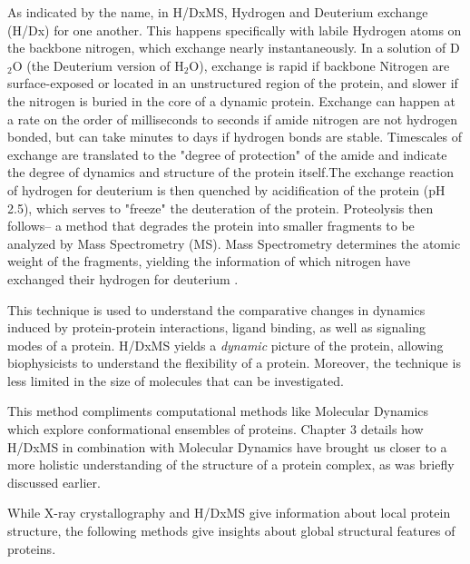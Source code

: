 \documentclass[12pt]{ucsddissertation}
\begin{document}
\begin{dissertationintroduction}
As indicated by the name, in H/DxMS, Hydrogen and Deuterium exchange (H/Dx) for one another. This happens specifically with labile Hydrogen atoms on the backbone nitrogen, which exchange nearly instantaneously.  In a solution of D$_{2}$O (the Deuterium version of H$_{2}$O), exchange is rapid if backbone Nitrogen are surface-exposed or located in an unstructured region of the protein, and slower if the nitrogen is buried in the core of a dynamic protein. Exchange can happen at a rate on the order of milliseconds to seconds if amide nitrogen are not hydrogen bonded, but can take minutes to days if hydrogen bonds are stable. Timescales of exchange are translated to the  "degree of protection" of the amide and indicate the degree of dynamics and structure of the protein itself.The exchange reaction of hydrogen for deuterium is then quenched by acidification of the protein (pH ~ 2.5), which serves to "freeze" the deuteration of the protein.  Proteolysis then follows-- a method that degrades the protein into smaller fragments to be analyzed by Mass Spectrometry (MS). Mass Spectrometry determines the atomic weight of the fragments, yielding the information of which nitrogen have exchanged their hydrogen for deuterium \cite{Konermann2011}. 

This technique is used to understand the comparative changes in dynamics induced by protein-protein interactions, ligand binding, as well as signaling modes of a protein\cite{Harrison2016}. H/DxMS yields a \textit{dynamic} picture of the protein, allowing biophysicists to understand the flexibility of a protein. Moreover, the technique is less limited in the size of molecules that can be investigated. 

This method compliments computational methods like Molecular Dynamics which explore conformational ensembles of proteins. Chapter 3  details how H/DxMS in combination with Molecular Dynamics have brought us closer to a more holistic understanding of the structure of a protein complex, as was briefly discussed earlier. 

While X-ray crystallography and H/DxMS give information about local protein structure, the following methods give insights about global structural features of proteins. 


\end{dissertationintroduction}
\end{document}
